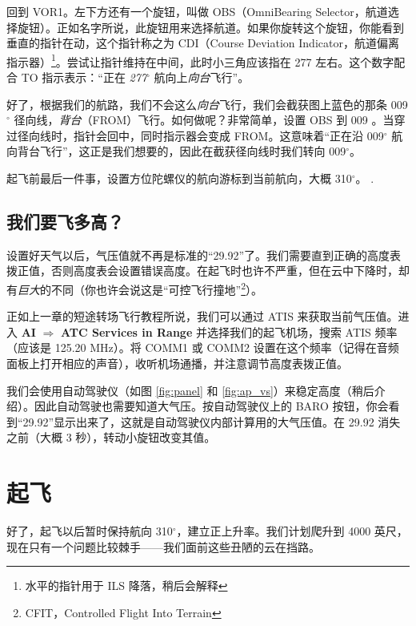 回到 VOR1。左下方还有一个旋钮，叫做 OBS（OmniBearing Selector，航道选择旋钮）。正如名字所说，此旋钮用来选择航道。如果你旋转这个旋钮，你能看到垂直的指针在动，这个指针称之为 CDI（Course Deviation Indicator，航道偏离指示器）\footnote{水平的指针用于 ILS 降落，稍后会解释}。尝试让指针维持在中间，此时小三角应该指在 277 左右。这个数字配合 TO 指示表示：“正在 \emph{277$^\circ$} 航向上\emph{向台}飞行”。

好了，根据我们的航路，我们不会这么\emph{向台}飞行，我们会截获图上蓝色的那条 009$^\circ$ 径向线，\emph{背台}（FROM）飞行。如何做呢？非常简单，设置 OBS 到 009 。当穿过径向线时，指针会回中，同时指示器会变成 FROM。这意味着“正在沿 009$^\circ$ 航向背台飞行”，这正是我们想要的，因此在截获径向线时我们转向 009$^\circ$。

起飞前最后一件事，设置方位陀螺仪的航向游标到当前航向，大概 310$^\circ$。 .

\subsection{我们要飞多高？}

设置好天气以后，气压值就不再是标准的“29.92”了。我们需要直到正确的高度表拨正值，否则高度表会设置错误高度。在起飞时也许不严重，但在云中下降时，却有\emph{巨大}的不同（你也许会说这是“可控飞行撞地”\footnote{CFIT，Controlled Flight Into Terrain}）。

正如上一章的短途转场飞行教程所说，我们可以通过 ATIS 来获取当前气压值。进入 \textbf{\textsf{AI}} $\Rightarrow$ \textbf{\textsf{ATC Services in Range}} 并选择我们的起飞机场，搜索 ATIS 频率（应该是 125.20 MHz）。将 COMM1 或 COMM2 设置在这个频率（记得在音频面板上打开相应的声音），收听机场通播，并注意调节高度表拨正值。

我们会使用自动驾驶仪（如图 \ref{fig:panel} 和 \ref{fig:ap_vs}）来稳定高度（稍后介绍）。因此自动驾驶也需要知道大气压。按自动驾驶仪上的 BARO 按钮，你会看到“29.92”显示出来了，这就是自动驾驶仪内部计算用的大气压值。在 29.92 消失之前（大概 3 秒），转动小旋钮改变其值。

\section{起飞}

好了，起飞以后暂时保持航向 310$^\circ$，建立正上升率。我们计划爬升到 4000 英尺，现在只有一个问题比较棘手——我们面前这些丑陋的云在挡路。

